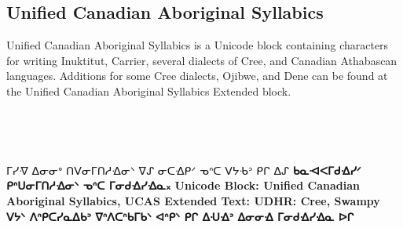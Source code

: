 \subsection{Unified Canadian Aboriginal Syllabics}

Unified Canadian Aboriginal Syllabics is a Unicode block containing characters for writing Inuktitut, Carrier, several dialects of Cree, and Canadian Athabascan languages. Additions for some Cree dialects, Ojibwe, and Dene can be found at the Unified Canadian Aboriginal Syllabics Extended block.
\medskip

\newfontfamily{}
\bgroup
\par
\noindent
\colorbox{graphicbackground}{\color{black}^^A
\begin{minipage}{\textwidth}^^A
\parindent1pt
\vskip10pt
 \rightskip\leftskip

\aboriginal
ᒥᓯᐌ ᐃᓂᓂᐤ ᑎᐯᓂᒥᑎᓱᐎᓂᐠ ᐁᔑ ᓂᑕᐎᑭᐟ ᓀᐢᑕ ᐯᔭᑾᐣ ᑭᒋ ᐃᔑ
\bfseries ᑲᓇᐗᐸᒥᑯᐎᓯᐟ ᑭᐢᑌᓂᒥᑎᓱᐎᓂᐠ ᓀᐢᑕ ᒥᓂᑯᐎᓯᐎᓇ᙮
Unicode Block: Unified Canadian Aboriginal Syllabics, UCAS Extended
Text: UDHR: Cree, Swampy ᐯᔭᐠ ᐱᐢᑭᑕᓯᓇᐃᑲᐣ ᐁᐢᐱᑕᐢᑲᒥᑲᐠ ᐊᐢᑭᐠ ᑭᒋ ᐃᑗᐎᐣ ᐃᓂᓂᐎ ᒥᓂᑯᐎᓯᐎᓇ ᐅᒋ
\par
\vspace*{10pt}
\end{minipage}
}
\medskip
\egroup